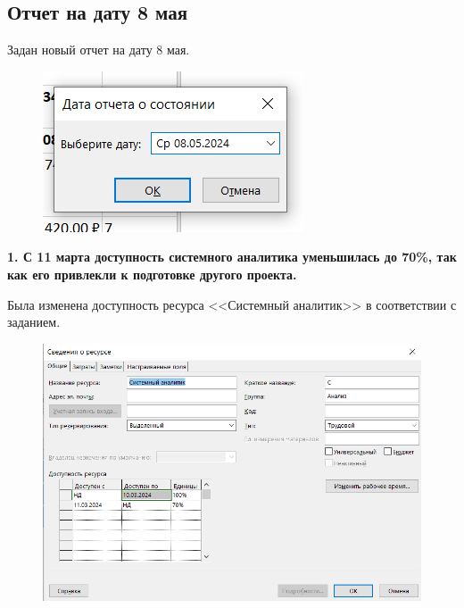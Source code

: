 \subsection*{Отчет на дату 8 мая}

Задан новый отчет на дату 8 мая.

\begin{figure}[h!]
	\begin{center}
		\includegraphics[scale=0.8]{inc/img/p_2.png}
	\end{center}
	\captionsetup{justification=centering}
	\label{fig:u3}
\end{figure}

\textbf{1. С 11 марта доступность системного аналитика уменьшилась до 70\%, так как его привлекли к подготовке другого проекта.}

Была изменена доступность ресурса <<Системный аналитик>> в соответствии с заданием.

\begin{figure}[h!]
	\begin{center}
		\includegraphics[scale=0.8]{inc/img/p_3.png}
	\end{center}
	\captionsetup{justification=centering}
	\label{fig:u3}
\end{figure}

